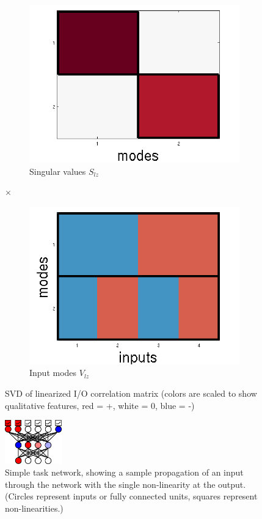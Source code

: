 \documentclass[10pt,letterpaper]{article}
\begin{document}
\begin{figure}
\begin{subfigure}{0.22\textwidth}
\includegraphics[width=\textwidth]{figures/S_lz.png}
\caption{Singular values $S_{lz}$}
\end{subfigure}
\LARGE{$\times$}
\begin{subfigure}{0.22\textwidth}
\includegraphics[width=\textwidth]{figures/V_lz.png}
\caption{Input modes $V_{lz}$}
\end{subfigure}
\caption{SVD of linearized I/O correlation matrix (colors are scaled to show qualitative features, red = +, white = 0, blue = -)}
\label{linearized_SVD_figure}
\end{figure}
\begin{figure}
\centering
\includegraphics[width=0.22\textwidth]{figures/network_diagram.png}
\caption{Simple task network, showing a sample propagation of an input through the network with the single non-linearity at the output. (Circles represent inputs or fully connected units, squares represent non-linearities.) }
\label{network_diagram}
\end{figure}
\end{document}
